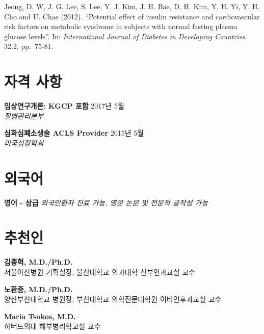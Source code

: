 \documentclass[12pt,]{article}
\begin{document}
Jeong, D. W, J. G. Lee, S. Lee, Y. J. Kim, J. H. Bae, D. H. Kim, Y. H.
Yi, Y. H. Cho and U. Chae (2012). ``Potential effect of insulin
resistance and cardiovascular risk factors on metabolic syndrome in
subjects with normal fasting plasma glucose levels''. In:
\emph{International Journal of Diabetes in Developing Countries} 32.2,
pp.~75-81.

\hypertarget{-}{%
\section{자격 사항}\label{-}}

\textbf{임상연구개론: KGCP 포함} \hfill 2017년 5월\\
\emph{질병관리본부}

\textbf{심화심폐소생술 ACLS Provider} \hfill 2015년 5월\\
\emph{미국심장학회}

\section{외국어}

\textbf{영어 - 상급} \emph{외국인환자 진료 가능, 영문 논문 및 전문적
글작성 가능}

\pagebreak

\section{추천인}

\textbf{김종혁, M.D./Ph.D.}\\
서울아산병원 기획실장, 울산대학교 의과대학 산부인과교실 교수

\textbf{노환중, M.D./Ph.D.}\\
양산부산대학교 병원장, 부산대학교 의학전문대학원 이비인후과교실 교수

\textbf{Maria Tsokos, M.D.}\\
하버드의대 해부병리학교실 교수
\end{document}
